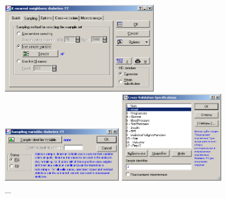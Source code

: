 \begin{figure}[!h]
  \centering

  \begin{minipage}{0.32\textwidth}
    \centering

    \includegraphics[height=3.8cm]
    {inc/v5_5.PNG}

    \caption{\_}

    \label{fig:5}
  \end{minipage}
  \begin{minipage}{0.42\textwidth}
    \centering

    \includegraphics[width=5cm]
    {inc/v5_6.PNG}

    \caption{\_}

    \label{fig:6}
  \end{minipage}
  \begin{minipage}{0.22\textwidth}
    \centering

    \includegraphics[height=3.8cm]
    {inc/v5_7.PNG}

    \caption{\_}

    \label{fig:7}
  \end{minipage}
\end{figure}

